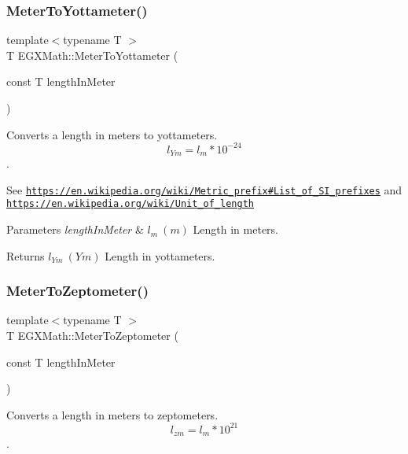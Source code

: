\subsubsection{\texorpdfstring{Meter\+To\+Yottameter()}{MeterToYottameter()}}
{\footnotesize\ttfamily template$<$typename T $>$ \\
T E\+G\+X\+Math\+::\+Meter\+To\+Yottameter (\begin{DoxyParamCaption}\item[{const T}]{length\+In\+Meter }\end{DoxyParamCaption})}



Converts a length in meters to yottameters. \[ l_{Ym}=l_{m} * 10^{-24} \]. 

See \href{https://en.wikipedia.org/wiki/Metric_prefix#List_of_SI_prefixes}{\tt https\+://en.\+wikipedia.\+org/wiki/\+Metric\+\_\+prefix\#\+List\+\_\+of\+\_\+\+S\+I\+\_\+prefixes} and \href{https://en.wikipedia.org/wiki/Unit_of_length}{\tt https\+://en.\+wikipedia.\+org/wiki/\+Unit\+\_\+of\+\_\+length} 
\begin{DoxyParams}{Parameters}
{\em length\+In\+Meter} & $ l_{m}\ (m)$ Length in meters. \\
\hline
\end{DoxyParams}
\begin{DoxyReturn}{Returns}
$ l_{Ym}\ (Ym)$ Length in yottameters. 
\end{DoxyReturn}
\mbox{\label{group___e_g_x_math-_conversions-_length_conversions-_meter-_s_i_ga865c00bc3abce82de30d18022f460a5c}} 
\subsubsection{\texorpdfstring{Meter\+To\+Zeptometer()}{MeterToZeptometer()}}
{\footnotesize\ttfamily template$<$typename T $>$ \\
T E\+G\+X\+Math\+::\+Meter\+To\+Zeptometer (\begin{DoxyParamCaption}\item[{const T}]{length\+In\+Meter }\end{DoxyParamCaption})}



Converts a length in meters to zeptometers. \[ l_{zm}=l_{m} * 10^{21} \]. 

